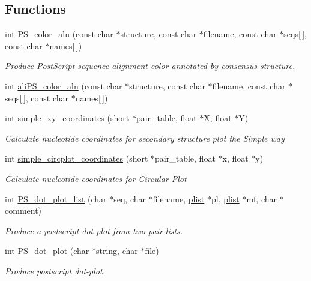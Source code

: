 \subsection*{Functions}
\begin{DoxyCompactItemize}
\item 
\mbox{\label{group__plotting__utils_ga821802c3685e37e15182341f6217470d}} 
int \hyperlink{group__plotting__utils_ga821802c3685e37e15182341f6217470d}{P\+S\+\_\+color\+\_\+aln} (const char $\ast$structure, const char $\ast$filename, const char $\ast$seqs\mbox{[}$\,$\mbox{]}, const char $\ast$names\mbox{[}$\,$\mbox{]})
\begin{DoxyCompactList}\small\item\em Produce Post\+Script sequence alignment color-\/annotated by consensus structure. \end{DoxyCompactList}\item 
int \hyperlink{group__plotting__utils_gaab48d4dac655d688abe921389ac2847c}{ali\+P\+S\+\_\+color\+\_\+aln} (const char $\ast$structure, const char $\ast$filename, const char $\ast$seqs\mbox{[}$\,$\mbox{]}, const char $\ast$names\mbox{[}$\,$\mbox{]})
\item 
int \hyperlink{group__plotting__utils_gaf4b9173e7d3fd361c3c85e6def194123}{simple\+\_\+xy\+\_\+coordinates} (short $\ast$pair\+\_\+table, float $\ast$X, float $\ast$Y)
\begin{DoxyCompactList}\small\item\em Calculate nucleotide coordinates for secondary structure plot the {\itshape Simple way} \end{DoxyCompactList}\item 
int \hyperlink{group__plotting__utils_gac4ea13d35308f09940178d2b05a248c2}{simple\+\_\+circplot\+\_\+coordinates} (short $\ast$pair\+\_\+table, float $\ast$x, float $\ast$y)
\begin{DoxyCompactList}\small\item\em Calculate nucleotide coordinates for {\itshape Circular Plot} \end{DoxyCompactList}\item 
int \hyperlink{group__plotting__utils_ga00ea223b5cf02eb2faae5ff29f0d5e12}{P\+S\+\_\+dot\+\_\+plot\+\_\+list} (char $\ast$seq, char $\ast$filename, \hyperlink{group__data__structures_ga9608eed021ebfbdd7a901cfdc446c8e9}{plist} $\ast$pl, \hyperlink{group__data__structures_ga9608eed021ebfbdd7a901cfdc446c8e9}{plist} $\ast$mf, char $\ast$comment)
\begin{DoxyCompactList}\small\item\em Produce a postscript dot-\/plot from two pair lists. \end{DoxyCompactList}\item 
int \hyperlink{group__plotting__utils_ga689a97a7e3b8a2df14728b8204d9d57b}{P\+S\+\_\+dot\+\_\+plot} (char $\ast$string, char $\ast$file)
\begin{DoxyCompactList}\small\item\em Produce postscript dot-\/plot. \end{DoxyCompactList}\end{DoxyCompactItemize}
